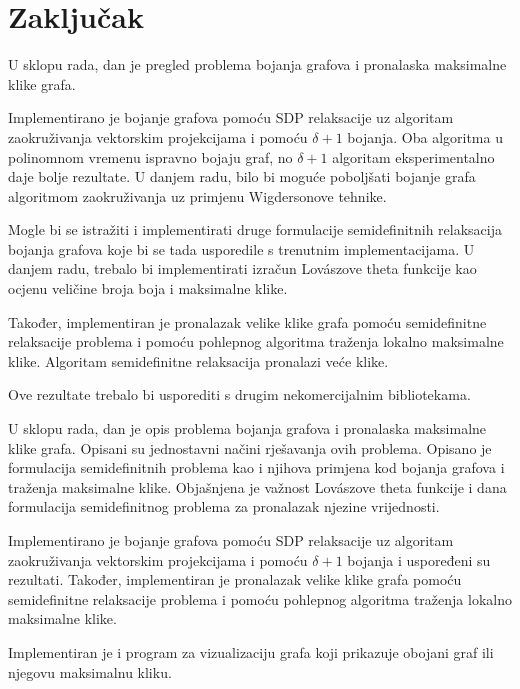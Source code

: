 \documentclass[diplomskirad]{fer}
\begin{document}
\chapter{Zaključak}
\label{pog:zakljucak}
U sklopu rada, dan je pregled problema bojanja grafova i pronalaska maksimalne klike grafa.

Implementirano je bojanje grafova pomoću SDP relaksacije uz algoritam zaokruživanja vektorskim projekcijama i pomoću $\delta + 1$ bojanja. 
Oba algoritma u polinomnom vremenu ispravno bojaju graf, no $\delta +1$ algoritam eksperimentalno daje bolje rezultate.
U danjem radu, bilo bi moguće poboljšati bojanje grafa algoritmom zaokruživanja uz primjenu Wigdersonove tehnike.

Mogle bi se istražiti i implementirati druge formulacije semidefinitnih relaksacija bojanja grafova koje bi se tada usporedile s trenutnim
implementacijama. U danjem radu, trebalo bi implementirati izračun Lovászove theta funkcije kao ocjenu veličine broja boja i maksimalne klike.

Također, implementiran je pronalazak velike klike grafa pomoću semidefinitne relaksacije problema i pomoću
pohlepnog algoritma traženja lokalno maksimalne klike. Algoritam semidefinitne relaksacija pronalazi veće klike.

Ove rezultate trebalo bi usporediti s drugim nekomercijalnim bibliotekama.








\begin{sazetak}
U sklopu rada, dan je opis problema bojanja grafova i pronalaska maksimalne klike grafa. Opisani su jednostavni načini rješavanja
ovih problema. Opisano je formulacija semidefinitnih problema kao i njihova primjena kod bojanja grafova i traženja maksimalne klike.
Objašnjena je važnost Lovászove theta funkcije i dana formulacija semidefinitnog problema za pronalazak njezine vrijednosti.

Implementirano je bojanje grafova pomoću SDP relaksacije uz algoritam zaokruživanja vektorskim projekcijama i pomoću $\delta + 1$ bojanja
i uspoređeni su rezultati. Također, implementiran je pronalazak velike klike grafa pomoću semidefinitne relaksacije problema i pomoću
pohlepnog algoritma traženja lokalno maksimalne klike.

Implementiran je i program za vizualizaciju grafa koji prikazuje obojani graf ili njegovu maksimalnu kliku.

\end{sazetak}
\end{document}
